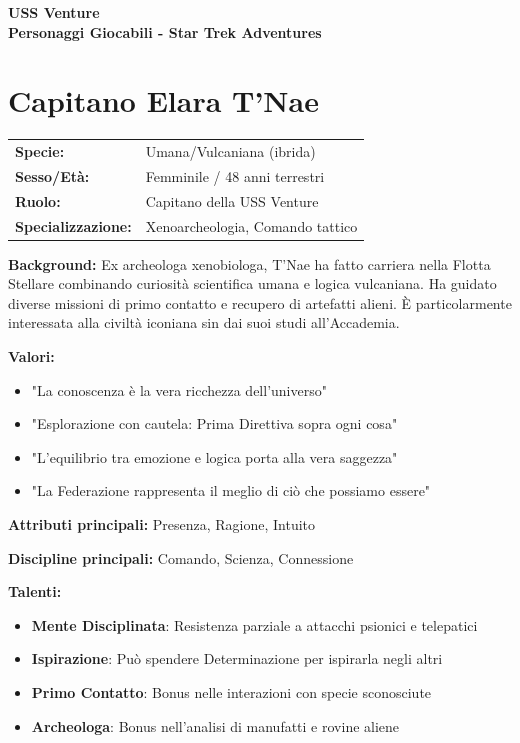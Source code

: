 \documentclass[11pt,a4paper]{article}
\begin{document}
\begin{center}
\Huge\textbf{\textcolor{fedblue}{USS Venture}}\\[0.5cm]
\Large\textbf{Personaggi Giocabili - Star Trek Adventures}
\end{center}

\section{Capitano Elara T'Nae}

\begin{tcolorbox}[colback=fedlightblue!10, colframe=fedblue]
\begin{tabularx}{\textwidth}{lX}
\textbf{Specie:} & Umana/Vulcaniana (ibrida) \\
\textbf{Sesso/Età:} & Femminile / 48 anni terrestri \\
\textbf{Ruolo:} & Capitano della USS Venture \\
\textbf{Specializzazione:} & Xenoarcheologia, Comando tattico \\
\end{tabularx}

\textbf{Background:} Ex archeologa xenobiologa, T'Nae ha fatto carriera nella Flotta Stellare combinando curiosità scientifica umana e logica vulcaniana. Ha guidato diverse missioni di primo contatto e recupero di artefatti alieni. È particolarmente interessata alla civiltà iconiana sin dai suoi studi all'Accademia.

\textbf{Valori:}
\begin{itemize}[leftmargin=*]
\item "La conoscenza è la vera ricchezza dell'universo"
\item "Esplorazione con cautela: Prima Direttiva sopra ogni cosa"
\item "L'equilibrio tra emozione e logica porta alla vera saggezza"
\item "La Federazione rappresenta il meglio di ciò che possiamo essere"
\end{itemize}

\textbf{Attributi principali:} Presenza, Ragione, Intuito

\textbf{Discipline principali:} Comando, Scienza, Connessione

\textbf{Talenti:}
\begin{itemize}[leftmargin=*]
\item \textbf{Mente Disciplinata}: Resistenza parziale a attacchi psionici e telepatici
\item \textbf{Ispirazione}: Può spendere Determinazione per ispirarla negli altri
\item \textbf{Primo Contatto}: Bonus nelle interazioni con specie sconosciute
\item \textbf{Archeologa}: Bonus nell'analisi di manufatti e rovine aliene
\end{itemize}
\end{tcolorbox}
\end{document}
